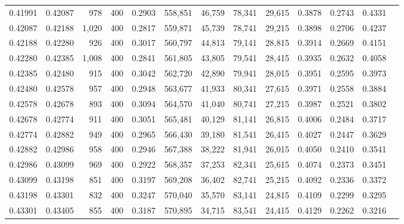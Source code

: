 \begin{tabular}{rrrrrrrrrrrrr}
0.41991 & 0.42087 &    978 & 400 &                                     0.2903 & 558,851 &  46,759 &  78,341 &  29,615 & 0.3878 & 0.2743 & 0.4331 \\
0.42087 & 0.42188 &  1,020 & 400 &                                     0.2817 & 559,871 &  45,739 &  78,741 &  29,215 & 0.3898 & 0.2706 & 0.4237 \\
0.42188 & 0.42280 &    926 & 400 &                                     0.3017 & 560,797 &  44,813 &  79,141 &  28,815 & 0.3914 & 0.2669 & 0.4151 \\
0.42280 & 0.42385 &  1,008 & 400 &                                     0.2841 & 561,805 &  43,805 &  79,541 &  28,415 & 0.3935 & 0.2632 & 0.4058 \\
0.42385 & 0.42480 &    915 & 400 &                                     0.3042 & 562,720 &  42,890 &  79,941 &  28,015 & 0.3951 & 0.2595 & 0.3973 \\
0.42480 & 0.42578 &    957 & 400 &                                     0.2948 & 563,677 &  41,933 &  80,341 &  27,615 & 0.3971 & 0.2558 & 0.3884 \\
0.42578 & 0.42678 &    893 & 400 &                                     0.3094 & 564,570 &  41,040 &  80,741 &  27,215 & 0.3987 & 0.2521 & 0.3802 \\
0.42678 & 0.42774 &    911 & 400 &                                     0.3051 & 565,481 &  40,129 &  81,141 &  26,815 & 0.4006 & 0.2484 & 0.3717 \\
0.42774 & 0.42882 &    949 & 400 &                                     0.2965 & 566,430 &  39,180 &  81,541 &  26,415 & 0.4027 & 0.2447 & 0.3629 \\
0.42882 & 0.42986 &    958 & 400 &                                     0.2946 & 567,388 &  38,222 &  81,941 &  26,015 & 0.4050 & 0.2410 & 0.3541 \\
0.42986 & 0.43099 &    969 & 400 &                                     0.2922 & 568,357 &  37,253 &  82,341 &  25,615 & 0.4074 & 0.2373 & 0.3451 \\
0.43099 & 0.43198 &    851 & 400 &                                     0.3197 & 569,208 &  36,402 &  82,741 &  25,215 & 0.4092 & 0.2336 & 0.3372 \\
0.43198 & 0.43301 &    832 & 400 &                                     0.3247 & 570,040 &  35,570 &  83,141 &  24,815 & 0.4109 & 0.2299 & 0.3295 \\
0.43301 & 0.43405 &    855 & 400 &                                     0.3187 & 570,895 &  34,715 &  83,541 &  24,415 & 0.4129 & 0.2262 & 0.3216 \\

\end{tabular}

